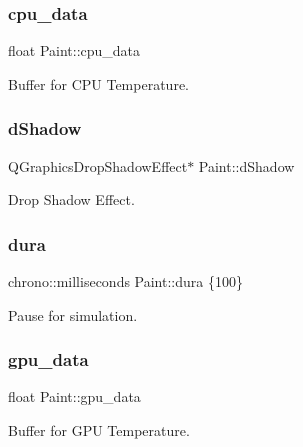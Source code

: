 \subsubsection{\texorpdfstring{cpu\_data}{cpu\_data}}
{\footnotesize\ttfamily float Paint\+::cpu\+\_\+data\hspace{0.3cm}{\ttfamily [private]}}



Buffer for C\+PU Temperature. 

\mbox{\label{classPaint_adc5781ac10ec78958b8818b46a096914}} 
\subsubsection{\texorpdfstring{dShadow}{dShadow}}
{\footnotesize\ttfamily Q\+Graphics\+Drop\+Shadow\+Effect$\ast$ Paint\+::d\+Shadow\hspace{0.3cm}{\ttfamily [private]}}



Drop Shadow Effect. 

\mbox{\label{classPaint_a596f261f63bbc34d4ec35639eeb148ce}} 
\subsubsection{\texorpdfstring{dura}{dura}}
{\footnotesize\ttfamily chrono\+::milliseconds Paint\+::dura \{100\}\hspace{0.3cm}{\ttfamily [private]}}



Pause for simulation. 

\mbox{\label{classPaint_a561a7ed14d82369f8a88ba76b0bcbb7e}} 
\subsubsection{\texorpdfstring{gpu\_data}{gpu\_data}}
{\footnotesize\ttfamily float Paint\+::gpu\+\_\+data\hspace{0.3cm}{\ttfamily [private]}}



Buffer for G\+PU Temperature. 

\mbox{\label{classPaint_ad3674af36118608e17d5f49812f0e398}} 
